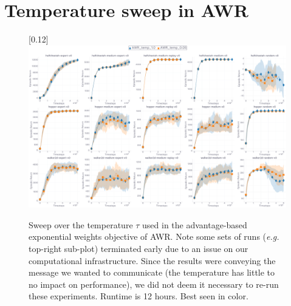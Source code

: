 \section{Temperature sweep in AWR}
\label{awrsweep}

\begin{figure}[H]
  \center\scalebox{0.12}[0.12]{\includegraphics{Plots/awr_sweep/plots_main_eval_env_ret_plot.pdf}}
  \caption{Sweep over the temperature $\tau$ used in the advantage-based exponential weights objective of AWR.
  Note some sets of runs (\textit{e.g.} top-right sub-plot) terminated early due to an issue on
  our computational infrastructure.
  Since the results were conveying the message we wanted to communicate (the temperature has little to no
  impact on performance), we did not deem it necessary to re-run these experiments.
  Runtime is 12 hours. Best seen in color.}
  \label{awrsweep:barplot}
\end{figure}
